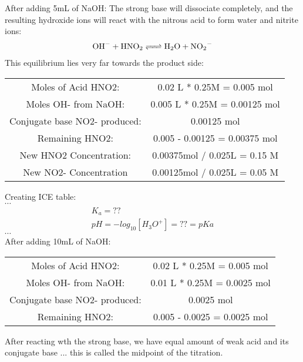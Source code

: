 \documentclass[../CHEM152Notes.tex]{subfiles}
\begin{document}
After adding 5mL of NaOH:
\newline
The strong base will dissociate completely, and the resulting hydroxide ions will react with the nitrous acid to form water and nitrite ions:
\begin{equation*}
    \begin{aligned}
        \ce{OH- + HNO2 <=> H2O + NO2-}
    \end{aligned}
\end{equation*}
This equilibrium lies very far towards the product side:
\begin{center}
    \begin{tabular}{ c c }
    Moles of Acid HNO2: & 0.02 L * 0.25M = 0.005 mol \\
    Moles OH- from NaOH: & 0.005 L * 0.25M = 0.00125 mol \\
    Conjugate base NO2- produced: & 0.00125 mol \\
    Remaining HNO2: & 0.005 - 0.00125 = 0.00375 mol \\
    New HNO2 Concentration: & 0.00375mol / 0.025L = 0.15 M \\
    New NO2- Concentration & 0.00125mol / 0.025L  = 0.05 M 
    \end{tabular}    
\end{center}
Creating ICE table: \\
$\cdots$ %
\begin{equation*}
    \begin{aligned}
        K_a = ?? \\
        pH = -log_{10}[H_3O^+] = ?? = pKa
    \end{aligned}
\end{equation*}
$\cdots$ \\ %
After adding 10mL of NaOH:
\begin{center}
    \begin{tabular}{ c c }
    Moles of Acid HNO2: & 0.02 L * 0.25M = 0.005 mol \\
    Moles OH- from NaOH: & 0.01 L * 0.25M = 0.0025 mol \\
    Conjugate base NO2- produced: & 0.0025 mol \\
    Remaining HNO2: & 0.005 - 0.0025 = 0.0025 mol
    \end{tabular}    
\end{center}
After reacting wth the strong base, we have equal amount of weak acid and its conjugate base ... this is called the midpoint of the titration.
\end{document}
